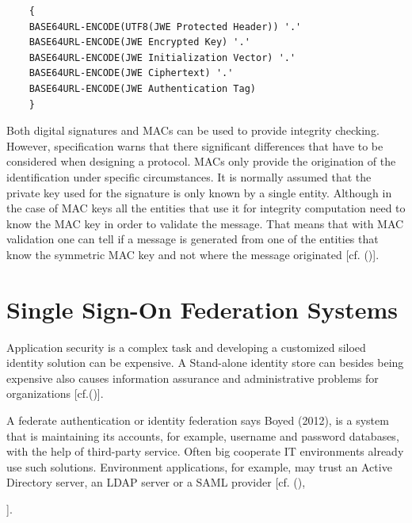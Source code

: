 {	
	\begin{lstlisting}
	{
	BASE64URL-ENCODE(UTF8(JWE Protected Header)) '.'
	BASE64URL-ENCODE(JWE Encrypted Key) '.'
	BASE64URL-ENCODE(JWE Initialization Vector) '.'
	BASE64URL-ENCODE(JWE Ciphertext) '.'
	BASE64URL-ENCODE(JWE Authentication Tag)
	}
	\end{lstlisting}
	
	Both digital signatures and MACs can be used to provide integrity checking. However, specification warns that there significant differences that have to be considered when designing a protocol. MACs only provide the origination of the identification under specific circumstances. It is normally assumed that the private key used for the signature is only known by a single entity. Although in the case of MAC keys all the entities that use it for integrity computation need to know the MAC key in order to validate the message. That means that with MAC validation one can tell if a message is generated from one of the entities that know the symmetric MAC key and not where the message originated [cf. (\cite{JWT:IETF:Jones:2015})].	

	
\section{Single Sign-On Federation Systems}

Application security is a complex task and developing a customized siloed identity solution can be expensive. A Stand-alone identity store can besides being expensive also causes information assurance and administrative problems for organizations  [cf.(\cite{JerichoSystems:IS})]. 

A federate authentication or identity federation says Boyed (2012), is a system that is maintaining its accounts, for example, username and password databases, with the help of third-party service. Often big cooperate IT environments already use such solutions. Environment applications, for example, may trust an Active Directory server, an LDAP server or a SAML provider [cf. (\cite{Birell:2013:FIMS}), {\cite{Boyed:2012:GSOA}].
	
}}
